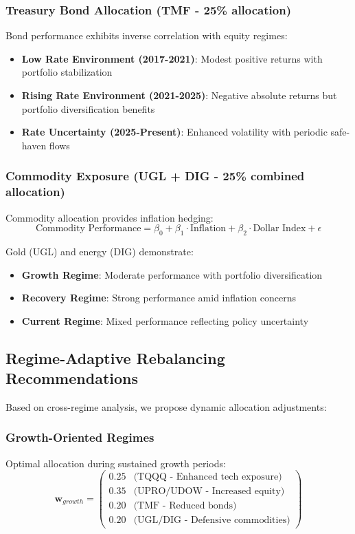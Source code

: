 \documentclass[onecolumn,ieee]{arithmaxresearch}
\begin{document}
\subsubsection{Treasury Bond Allocation (TMF - 25\% allocation)}

Bond performance exhibits inverse correlation with equity regimes:
\begin{itemize}
    \item \textbf{Low Rate Environment (2017-2021)}: Modest positive returns with portfolio stabilization
    \item \textbf{Rising Rate Environment (2021-2025)}: Negative absolute returns but portfolio diversification benefits
    \item \textbf{Rate Uncertainty (2025-Present)}: Enhanced volatility with periodic safe-haven flows
\end{itemize}

\subsubsection{Commodity Exposure (UGL + DIG - 25\% combined allocation)}

Commodity allocation provides inflation hedging:
\begin{equation}
\text{Commodity Performance} = \beta_0 + \beta_1 \cdot \text{Inflation} + \beta_2 \cdot \text{Dollar Index} + \epsilon
\end{equation}

Gold (UGL) and energy (DIG) demonstrate:
\begin{itemize}
    \item \textbf{Growth Regime}: Moderate performance with portfolio diversification
    \item \textbf{Recovery Regime}: Strong performance amid inflation concerns
    \item \textbf{Current Regime}: Mixed performance reflecting policy uncertainty
\end{itemize}

\subsection{Regime-Adaptive Rebalancing Recommendations}

Based on cross-regime analysis, we propose dynamic allocation adjustments:

\subsubsection{Growth-Oriented Regimes}
Optimal allocation during sustained growth periods:
\begin{equation}
\mathbf{w}_{growth} = \begin{pmatrix}
0.25 & \text{(TQQQ - Enhanced tech exposure)} \\
0.35 & \text{(UPRO/UDOW - Increased equity)} \\
0.20 & \text{(TMF - Reduced bonds)} \\
0.20 & \text{(UGL/DIG - Defensive commodities)}
\end{pmatrix}
\end{equation}
\end{document}
